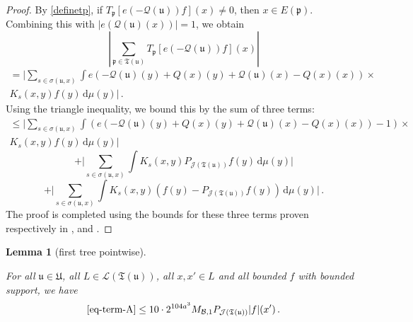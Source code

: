 \documentclass[10pt,a4paper]{article}
\theoremstyle{plain}
\newtheorem{lemma}[theorem]{Lemma}
\theoremstyle{definition}
\numberwithin{equation}{subsection}
\newcommand{\fp}{{\mathfrak p}}
\newcommand{\fu}{{\mathfrak u}}
\newcommand{\fU}{{\mathfrak U}}
\newcommand{\fT}{{\mathfrak T}}
\newcommand{\tQ}{{Q}}
\newcommand{\fcc}{{\mathcal{Q}}}
\newcommand{\lean}[1]{}
\newcommand{\uses}[1]{}
\newcommand{\leanok}{}
\begin{document}
\begin{proof}
    \leanok
    By \eqref{definetp}, if $T_{\fp}[ e(-\fcc(\fu))f](x) \ne 0$, then $x \in E(\fp)$. Combining this with $|e(\fcc(\fu)(x))| = 1$, we obtain
    $$
        |\sum_{\fp \in \fT(\fu)} T_{\fp}[ e(-\fcc(\fu))f](x)|
    $$
    \begin{multline*}
        = \Bigg| \sum_{s \in \sigma(\fu, x)} \int e(-\fcc(\fu)(y) + \tQ(x)(y) + \fcc(\fu)(x) -\tQ(x)(x))\times\\
        K_s(x,y)f(y) \, \mathrm{d}\mu(y) \Bigg|\,.
    \end{multline*}
    Using the triangle inequality, we bound this by the sum of three terms:
    \begin{multline}
        \label{eq-term-A}
        \le \Bigg| \sum_{s \in \sigma(\fu, x)} \int (e(-\fcc(\fu)(y) + \tQ(x)(y) + \fcc(\fu)(x) -\tQ(x)(x))-1)\times\\
        K_s(x,y)f(y) \, \mathrm{d}\mu(y) \Bigg|
    \end{multline}
    \begin{equation}
        \label{eq-term-B}
        + \Bigg| \sum_{s \in \sigma(\fu, x)} \int K_s(x,y) P_{\mathcal{J}(\fT(\fu))} f(y) \, \mathrm{d}\mu(y) \Bigg|
    \end{equation}
    \begin{equation}
        \label{eq-term-C}
        + \Bigg| \sum_{s \in \sigma(\fu, x)} \int K_s(x,y) (f(y) - P_{\mathcal{J}(\fT(\fu))} f(y)) \, \mathrm{d}\mu(y) \Bigg|\,.
    \end{equation}
    The proof is completed using the bounds for these three terms proven respectively in ,  and .
\end{proof}

\begin{lemma}[first tree pointwise]
    \label{first-tree-pointwise}
    \leanok
    \lean{TileStructure.Forest.first_tree_pointwise}
    \uses{convex-scales, kernel-summand}
    For all $\fu \in \fU$, all $L \in \mathcal{L}(\fT(\fu))$, all $x, x' \in L$ and all bounded $f$ with bounded support, we have
    $$
        \eqref{eq-term-A} \le 10 \cdot 2^{104a^3} M_{\mathcal{B}, 1}P_{\mathcal{J}(\fT(\fu))}|f|(x')\,.
    $$
\end{lemma}
\end{document}
